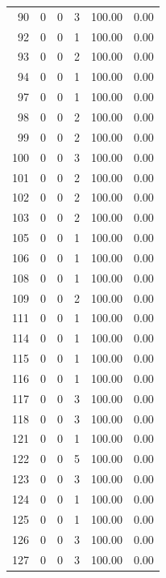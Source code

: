 \documentclass[11pt]{article}
\begin{document}
\begin{longtable}{r|r|r|r|r|r}
    90    & 0     & 0     & 3     & 100.00 & 0.00 \\
    92    & 0     & 0     & 1     & 100.00 & 0.00 \\
    93    & 0     & 0     & 2     & 100.00 & 0.00 \\
    94    & 0     & 0     & 1     & 100.00 & 0.00 \\
    97    & 0     & 0     & 1     & 100.00 & 0.00 \\
    98    & 0     & 0     & 2     & 100.00 & 0.00 \\
    99    & 0     & 0     & 2     & 100.00 & 0.00 \\
    100   & 0     & 0     & 3     & 100.00 & 0.00 \\
    101   & 0     & 0     & 2     & 100.00 & 0.00 \\
    102   & 0     & 0     & 2     & 100.00 & 0.00 \\
    103   & 0     & 0     & 2     & 100.00 & 0.00 \\
    105   & 0     & 0     & 1     & 100.00 & 0.00 \\
    106   & 0     & 0     & 1     & 100.00 & 0.00 \\
    108   & 0     & 0     & 1     & 100.00 & 0.00 \\
    109   & 0     & 0     & 2     & 100.00 & 0.00 \\
    111   & 0     & 0     & 1     & 100.00 & 0.00 \\
    114   & 0     & 0     & 1     & 100.00 & 0.00 \\
    115   & 0     & 0     & 1     & 100.00 & 0.00 \\
    116   & 0     & 0     & 1     & 100.00 & 0.00 \\
    117   & 0     & 0     & 3     & 100.00 & 0.00 \\
    118   & 0     & 0     & 3     & 100.00 & 0.00 \\
    121   & 0     & 0     & 1     & 100.00 & 0.00 \\
    122   & 0     & 0     & 5     & 100.00 & 0.00 \\
    123   & 0     & 0     & 3     & 100.00 & 0.00 \\
    124   & 0     & 0     & 1     & 100.00 & 0.00 \\
    125   & 0     & 0     & 1     & 100.00 & 0.00 \\
    126   & 0     & 0     & 3     & 100.00 & 0.00 \\
    127   & 0     & 0     & 3     & 100.00 & 0.00 \\

\end{longtable}
\end{document}
